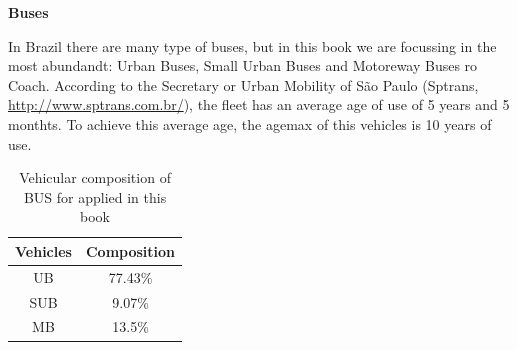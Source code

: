 \documentclass[12pt,graybox,envcountchap,sectrefs]{krantz}
\makeatletter
\newenvironment{Shaded}{\begin{snugshade}}{\end{snugshade}}
\newcommand{\KeywordTok}[1]{\textcolor[rgb]{0.13,0.29,0.53}{\textbf{#1}}}
\newcommand{\DataTypeTok}[1]{\textcolor[rgb]{0.13,0.29,0.53}{#1}}
\newcommand{\DecValTok}[1]{\textcolor[rgb]{0.00,0.00,0.81}{#1}}
\newcommand{\FloatTok}[1]{\textcolor[rgb]{0.00,0.00,0.81}{#1}}
\newcommand{\StringTok}[1]{\textcolor[rgb]{0.31,0.60,0.02}{#1}}
\newcommand{\OperatorTok}[1]{\textcolor[rgb]{0.81,0.36,0.00}{\textbf{#1}}}
\newcommand{\NormalTok}[1]{#1}
\newenvironment{kframe}{%
\medskip{}
\setlength{\fboxsep}{.8em}
 \def\at@end@of@kframe{}%
 \ifinner\ifhmode%
  \def\at@end@of@kframe{\end{minipage}}%
  \begin{minipage}{\columnwidth}%
 \fi\fi%
 \def\FrameCommand##1{\hskip\@totalleftmargin \hskip-\fboxsep
 \colorbox{shadecolor}{##1}\hskip-\fboxsep
     \hskip-\linewidth \hskip-\@totalleftmargin \hskip\columnwidth}%
 \MakeFramed {\advance\hsize-\width
   \@totalleftmargin\z@ \linewidth\hsize
   \@setminipage}}%
 {\par\unskip\endMakeFramed%
 \at@end@of@kframe}
\renewenvironment{Shaded}{\begin{kframe}}{\end{kframe}}
\theoremstyle{definition}
\theoremstyle{definition}
\theoremstyle{definition}
\theoremstyle{remark}
\makeatother
\begin{document}
\textbf{Buses}

In Brazil there are many type of buses, but in this book we are
focussing in the most abundandt: Urban Buses, Small Urban Buses and
Motoreway Buses ro Coach. According to the Secretary or Urban Mobility
of São Paulo (Sptrans, \url{http://www.sptrans.com.br/}), the fleet has
an average age of use of 5 years and 5 monthts. To achieve this average
age, the agemax of this vehicles is 10 years of use.

\begin{table}

\caption{\label{tab:compbus}Vehicular composition of BUS for applied in this book}
\centering
\begin{tabular}[t]{cc}
\toprule
Vehicles & Composition\\
\midrule
UB & 77.43\%\\
SUB & 9.07\%\\
MB & 13.5\%\\
\bottomrule
\end{tabular}
\end{table}

\begin{Shaded}
\end{Shaded}
\end{document}
